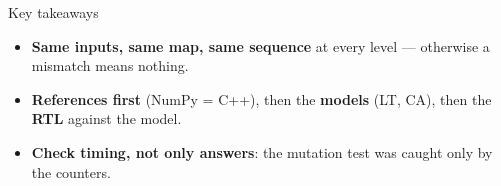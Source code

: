 \documentclass[aspectratio=169,11pt]{beamer}
\begin{document}
\begin{frame}{Key takeaways}
  \centering
  \vspace{5mm}
  \raggedright\small
  \begin{itemize}
    \item \textbf{Same inputs, same map, same sequence} at every level --- otherwise a mismatch means nothing.
    \item \textbf{References first} (NumPy = C++), then the \textbf{models} (LT, CA), then the
          \textbf{RTL} against the model.
    \item \textbf{Check timing, not only answers}: the mutation test was caught only by the counters.
  \end{itemize}
\end{frame}
\end{document}
